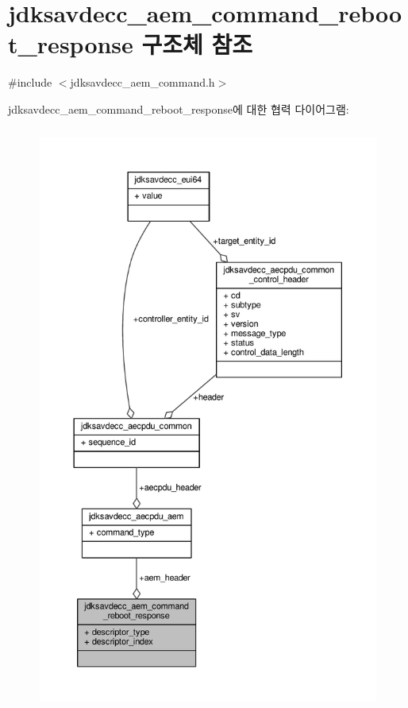 \hypertarget{structjdksavdecc__aem__command__reboot__response}{}\section{jdksavdecc\+\_\+aem\+\_\+command\+\_\+reboot\+\_\+response 구조체 참조}
\label{structjdksavdecc__aem__command__reboot__response}


{\ttfamily \#include $<$jdksavdecc\+\_\+aem\+\_\+command.\+h$>$}



jdksavdecc\+\_\+aem\+\_\+command\+\_\+reboot\+\_\+response에 대한 협력 다이어그램\+:
\nopagebreak
\begin{figure}[H]
\begin{center}
\leavevmode
\includegraphics[height=550pt]{structjdksavdecc__aem__command__reboot__response__coll__graph}
\end{center}
\end{figure}
